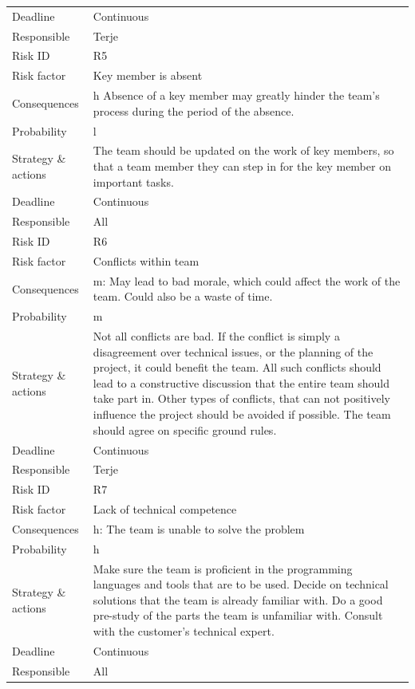 \begin{longtable}{>{\footnotesize}p{} >{\footnotesize}p{}}
	Deadline & Continuous \\
	Responsible & Terje \\
	\midrule
	Risk ID & R5 \\
	Risk factor & Key member is absent \\
	Consequences & \Gls{h} Absence of a key member may greatly hinder the team's process during the period of the absence. \\
	Probability & \Gls{l} \\ 
	Strategy \& actions & The team should be updated on the work of key members, so that a team member they can step in for the key member on important tasks. \\
	Deadline & Continuous \\
	Responsible & All \\
	\midrule
	Risk ID & R6 \\
	Risk factor & Conflicts within team \\
	Consequences & \Gls{m}: May lead to bad morale, which could affect the work of the team. Could also be a waste of time. \\
	Probability & \Gls{m} \\ 
	Strategy \& actions & Not all conflicts are bad. If the conflict is simply a disagreement over technical issues, or the planning of the project, it could benefit the team. All such conflicts should lead to a constructive discussion that the entire team should take part in. Other types of conflicts, that can not positively influence the project should be avoided if possible. The team should agree on specific ground rules. \\
	Deadline & Continuous \\
	Responsible & Terje \\
	\midrule
	Risk ID & R7 \\
	Risk factor & Lack of technical competence \\
	Consequences & \Gls{h}: The team is unable to solve the problem  \\
	Probability & \Gls{h} \\ 
	Strategy \& actions & Make sure the team is proficient in the programming languages and tools that are to be used. Decide on technical solutions that the team is already familiar with. Do a good pre-study of the parts the team is unfamiliar with. Consult with the customer’s technical expert. \\
	Deadline & Continuous \\
	Responsible & All \\

\end{longtable}
